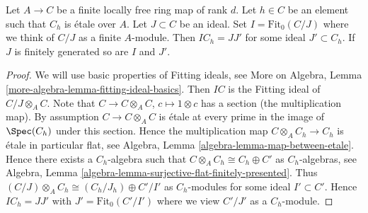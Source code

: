 \begin{lemma}
\label{lemma-trick-fitting-ideal}
Let $A \to C$ be a finite locally free ring map of rank $d$.
Let $h \in C$ be an element such that $C_h$ is \'etale over $A$.
Let $J \subset C$ be an ideal. Set $I = \text{Fit}_0(C/J)$ where we
think of $C/J$ as a finite $A$-module. Then $IC_h = JJ'$ for some ideal
$J' \subset C_h$. If $J$ is finitely generated so are $I$ and $J'$.
\end{lemma}

\begin{proof}
We will use basic properties of Fitting ideals, see
More on Algebra, Lemma \ref{more-algebra-lemma-fitting-ideal-basics}.
Then $IC$ is the Fitting ideal of $C/J \otimes_A C$.
Note that $C \to C \otimes_A C$, $c \mapsto 1 \otimes c$ has a section
(the multiplication map). By assumption $C \to C \otimes_A C$ is \'etale
at every prime in the image of $\Spec(C_h)$ under this section.
Hence the multiplication map $C \otimes_A C_h \to C_h$ is \'etale
in particular flat, see Algebra, Lemma \ref{algebra-lemma-map-between-etale}.
Hence there exists a $C_h$-algebra such that
$C \otimes_A C_h \cong C_h \oplus C'$ as $C_h$-algebras, see
Algebra, Lemma \ref{algebra-lemma-surjective-flat-finitely-presented}.
Thus $(C/J) \otimes_A C_h \cong (C_h/J_h) \oplus C'/I'$ as
$C_h$-modules for some ideal $I' \subset C'$.
Hence $IC_h = JJ'$ with $J' = \text{Fit}_0(C'/I')$ where we view
$C'/J'$ as a $C_h$-module.
\end{proof}
